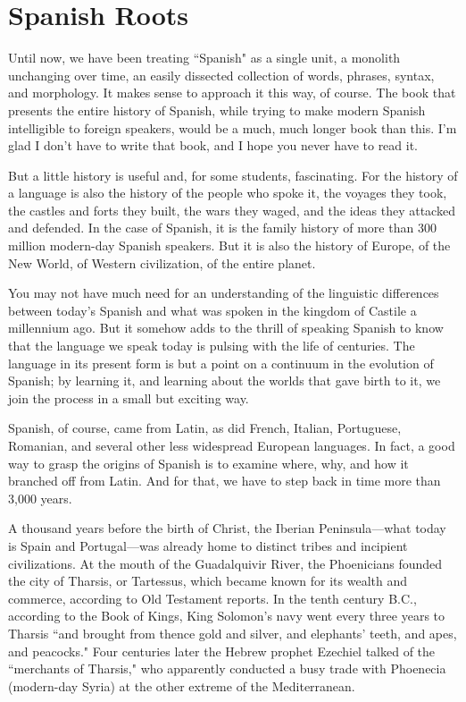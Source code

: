 \chapter{Spanish Roots}

Until now, we have been treating ``Spanish" as a single unit,
a monolith unchanging over time, an easily dissected collection of
words, phrases, syntax, and morphology. It makes sense to approach it
this way, of course. The book that presents the entire history of Spanish, while trying to make modern Spanish intelligible to foreign speakers, would be a much, much longer book than this. I'm glad I don't
have to write that book, and I hope you never have to read it.

But a little history is useful and, for some students, fascinating. For the history of a language is also the history of the people who
spoke it, the voyages they took, the castles and forts they built, the
wars they waged, and the ideas they attacked and defended. In the case
of Spanish, it is the family history of more than 300 million modern-day Spanish speakers. But it is also the history of Europe, of the New
World, of Western civilization, of the entire planet.

You may not have much need for an understanding of the linguistic differences between today's Spanish and what was spoken in
the kingdom of Castile a millennium ago. But it somehow adds to the
thrill of speaking Spanish to know that the language we speak today is
pulsing with the life of centuries. The language in its present form is
but a point on a continuum in the evolution of Spanish; by learning it,
and learning about the worlds that gave birth to it, we join the process
in a small but exciting way.

Spanish, of course, came from Latin, as did French, Italian,
Portuguese, Romanian, and several other less widespread European
languages. In fact, a good way to grasp the origins of Spanish is to examine where, why, and how it branched off from Latin. And for that,
we have to step back in time more than 3,000 years.

A thousand years before the birth of Christ, the Iberian Peninsula---what today is Spain and Portugal---was already home to distinct tribes and incipient civilizations. At the mouth of the Guadalquivir River, the Phoenicians founded the city of Tharsis, or Tartessus,
which became known for its wealth and commerce, according to Old
Testament reports. In the tenth century B.C., according to the Book
of Kings, King Solomon's navy went every three years to Tharsis
``and brought from thence gold and silver, and elephants' teeth, and
apes, and peacocks." Four centuries later the Hebrew prophet Ezechiel
talked of the ``merchants of Tharsis," who apparently conducted a
busy trade with Phoenecia (modern-day Syria) at the other extreme of
the Mediterranean.

